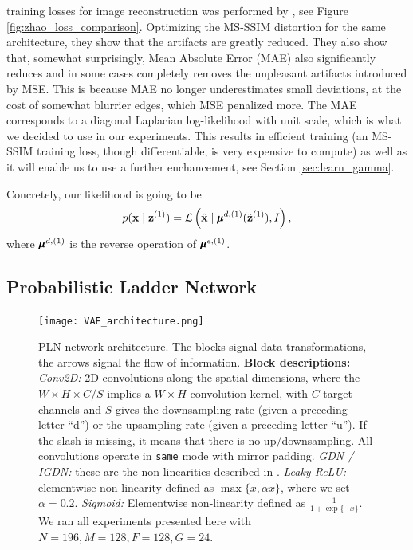training losses for image reconstruction was performed by
\cite{zhao2015loss}, see Figure \ref{fig:zhao_loss_comparison}. Optimizing the
MS-SSIM distortion for the same architecture, they show that the artifacts are
greatly reduced. They also show that, somewhat surprisingly, Mean Absolute Error
(MAE) also significantly reduces and in some cases completely removes the
unpleasant artifacts introduced by MSE.
This is because MAE no longer underestimates small deviations, at the cost of
somewhat blurrier edges, which MSE penalized more. The MAE corresponds to a
diagonal Laplacian log-likelihood with unit scale, which is what we decided to
use in our experiments. This results in efficient training (an MS-SSIM
training loss, though differentiable, is very expensive to compute) as well as
it will enable us to use a further enchancement, see Section
\ref{sec:learn_gamma}.

Concretely, our likelihood is going to be
\begin{equation}
\label{eq:laplace_likelihood}
  p(\mathbf{x} \mid \mathbf{z}^{(1)}) = \mathcal{L}\left( \hat{\mathbf{x}} \mid
  \pmb{\mu}^{d, (1)}(\tilde{\mathbf{z}}^{(1)}), I \right),
\end{equation}
where $\pmb{\mu}^{d, (1)}$ is the reverse operation of $\pmb{\mu}^{e, (1)}$.


\subsection{Probabilistic Ladder Network}
\label{sec:prob_ladder_networks}

\begin{figure}
  \centering
  \texttt{[image: VAE\_architecture.png]}
  \caption[Our Probabilistic Ladder Network (PLNl) architecture.]
  {PLN network architecture. The blocks signal data transformations, the
    arrows signal the flow of information. \textbf{Block descriptions:}
    \textit{Conv2D:} 2D convolutions along the spatial dimensions, where the
    $W\times H \times C / S$ implies a $W \times H$ convolution kernel, with $C$
  target channels and $S$ gives the downsampling rate (given a preceding letter
  ``d'') or the upsampling rate (given a preceding letter ``u''). If the slash
  is missing, it means that there is no up/downsampling. All convolutions operate
  in \texttt{same} mode with mirror padding. \textit{GDN / IGDN:} these are the
  non-linearities described in \cite{balle2016end}. \textit{Leaky ReLU:}
  elementwise non-linearity defined as $\max\{x, \alpha x\}$, where we set
  $\alpha=0.2$. \textit{Sigmoid:} Elementwise non-linearity defined as
  $\frac{1}{1 + \exp\{-x\}}$. We ran all
  experiments presented here with $N = 196, M = 128, F = 128, G = 24$.}
  \label{fig:pln_architecture}
\end{figure}

